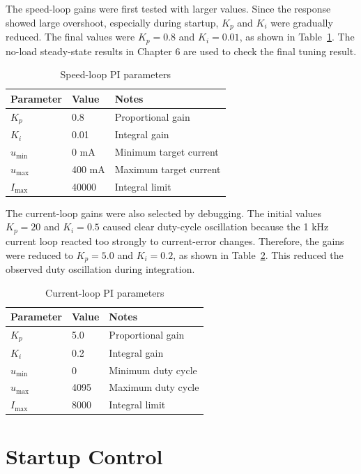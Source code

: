 \documentclass[12pt, a4paper]{report}
\begin{document}
The speed-loop gains were first tested with larger values. Since the response showed large overshoot, especially during startup, \(K_p\) and \(K_i\) were gradually reduced. The final values were \(K_p=0.8\) and \(K_i=0.01\), as shown in Table~\ref{tab:speed_pi_params}. The no-load steady-state results in Chapter 6 are used to check the final tuning result.
\begin{table}[H]
\centering
\caption{Speed-loop PI parameters}
\label{tab:speed_pi_params}
\small
\begin{tabular}{@{}p{}p{}p{}@{}}
\toprule
Parameter & Value & Notes \\
\midrule
\(K_p\) & 0.8 & Proportional gain \\
\(K_i\) & 0.01 & Integral gain \\
\(u_{\min}\) & 0 mA & Minimum target current \\
\(u_{\max}\) & 400 mA & Maximum target current \\
\(I_{\max}\) & 40000 & Integral limit \\
\bottomrule
\end{tabular}
\end{table}


The current-loop gains were also selected by debugging. The initial values \(K_p=20\) and \(K_i=0.5\) caused clear duty-cycle oscillation because the 1 kHz current loop reacted too strongly to current-error changes. Therefore, the gains were reduced to \(K_p=5.0\) and \(K_i=0.2\), as shown in Table~\ref{tab:current_pi_params}. This reduced the observed duty oscillation during integration.
\begin{table}[H]
\centering
\caption{Current-loop PI parameters}
\label{tab:current_pi_params}
\small
\begin{tabular}{@{}p{}p{}p{}@{}}
\toprule
Parameter & Value & Notes \\
\midrule
\(K_p\) & 5.0 & Proportional gain \\
\(K_i\) & 0.2 & Integral gain \\
\(u_{\min}\) & 0 & Minimum duty cycle \\
\(u_{\max}\) & 4095 & Maximum duty cycle \\
\(I_{\max}\) & 8000 & Integral limit \\
\bottomrule
\end{tabular}
\end{table}


\section{Startup Control}
\end{document}
